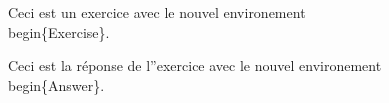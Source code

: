 \begin{Exercise}
Ceci est un exercice avec le nouvel environement \latex \\begin\{Exercise\}.
\end{Exercise}
\begin{Answer}
Ceci est la réponse de l''exercice avec le nouvel environement \latex \\begin\{Answer\}.
\end{Answer}